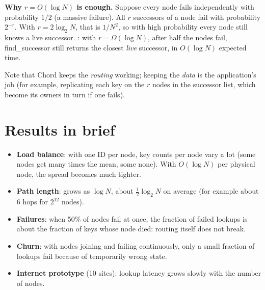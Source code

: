\textbf{Why $r = O(\log N)$ is enough.} Suppose every node fails independently with probability $1/2$ (a massive failure). All $r$ successors of a node fail with
probability $2^{-r}$. With $r = 2\log_2 N$, that is $1/N^2$, so with high probability every node still knows a live successor. : with
$r = \Omega(\log N)$, after half the nodes fail, find\_successor still returns the closest \emph{live} successor, in $O(\log N)$ expected time.

Note that Chord keeps the \emph{routing} working; keeping the \emph{data} is the application's job (for example, replicating each key on the $r$ nodes in the
successor list, which become its owners in turn if one fails).

\section{Results in brief}
\begin{itemize}
  \item \textbf{Load balance}: with one ID per node, key counts per node vary a lot (some nodes get many times the mean, some none). With
        $O(\log N)$  per physical node, the spread becomes much tighter.
  \item \textbf{Path length}: grows as $\log N$, about $\frac{1}{2}\log_2 N$ on average (for example about 6 hops for $2^{12}$ nodes).
  \item \textbf{Failures}: when 50\% of nodes fail at once, the fraction of failed lookups is about the fraction of keys whose node died: routing itself does
        not break.
  \item \textbf{Churn}: with nodes joining and failing continuously, only a small fraction of lookups fail because of temporarily wrong state.
  \item \textbf{Internet prototype} (10 sites): lookup latency grows slowly with the number of nodes.
\end{itemize}

